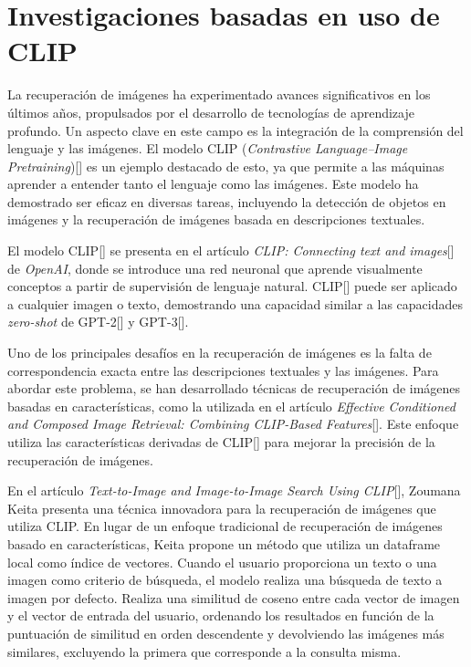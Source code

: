 \section{Investigaciones basadas en uso de CLIP}

La recuperación de imágenes ha experimentado avances significativos en los últimos años, propulsados por el desarrollo de tecnologías de aprendizaje profundo. Un aspecto clave en este campo es la integración de la comprensión del lenguaje y las imágenes. El modelo CLIP (\textit{Contrastive Language–Image Pretraining})[\cite{clip-paper}] es un ejemplo destacado de esto, ya que permite a las máquinas aprender a entender tanto el lenguaje como las imágenes. Este modelo ha demostrado ser eficaz en diversas tareas, incluyendo la detección de objetos en imágenes y la recuperación de imágenes basada en descripciones textuales.

El modelo CLIP[\cite{clip}] se presenta en el artículo  \textit{CLIP: Connecting text and images}[\cite{clip}] de \textit{OpenAI}, donde se introduce una red neuronal que aprende visualmente conceptos a partir de supervisión de lenguaje natural. CLIP[\cite{clip}] puede ser aplicado a cualquier imagen o texto, demostrando una capacidad similar a las capacidades \textit{zero-shot} de GPT-2[\cite{gpt2}] y GPT-3[\cite{gpt3}].

Uno de los principales desafíos en la recuperación de imágenes es la falta de correspondencia exacta entre las descripciones textuales y las imágenes. Para abordar este problema, se han desarrollado técnicas de recuperación de imágenes basadas en características, como la utilizada en el artículo \textit{Effective Conditioned and Composed Image Retrieval: Combining CLIP-Based Features}[\cite{Baldrati2022}]. Este enfoque utiliza las características derivadas de CLIP[\cite{clip}] para mejorar la precisión de la recuperación de imágenes.

En el artículo \textit{Text-to-Image and Image-to-Image Search Using CLIP}[\cite{keita2023clip}], Zoumana Keita presenta una técnica innovadora para la recuperación de imágenes que utiliza CLIP. En lugar de un enfoque tradicional de recuperación de imágenes basado en características, Keita propone un método que utiliza un dataframe local como índice de vectores. Cuando el usuario proporciona un texto o una imagen como criterio de búsqueda, el modelo realiza una búsqueda de texto a imagen por defecto. Realiza una similitud de coseno entre cada vector de imagen y el vector de entrada del usuario, ordenando los resultados en función de la puntuación de similitud en orden descendente y devolviendo las imágenes más similares, excluyendo la primera que corresponde a la consulta misma.

